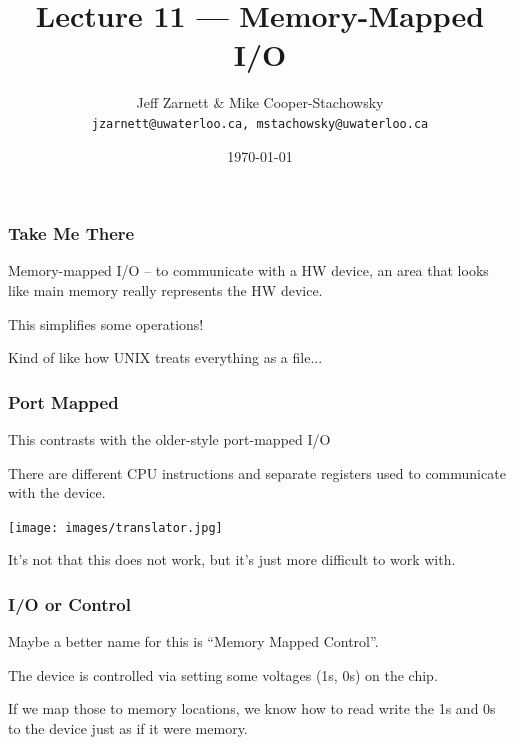 

\title{Lecture 11 --- Memory-Mapped I/O}

\author{Jeff Zarnett \& Mike Cooper-Stachowsky \\ \small \texttt{jzarnett@uwaterloo.ca, mstachowsky@uwaterloo.ca}}
\date{\today}



\begin{frame}
  \titlepage

 \end{frame}


\begin{frame}
\frametitle{Take Me There}

Memory-mapped I/O -- to communicate with a HW device, an area that looks like main memory really represents the HW device.

This simplifies some operations!

Kind of like how UNIX treats everything as a file...

\end{frame}

\begin{frame}
\frametitle{Port Mapped}

This contrasts with the older-style \alert{port-mapped} I/O

There are different CPU instructions and separate registers used to communicate with the device. 

\begin{center}
	\texttt{[image: images/translator.jpg]}
\end{center}

It's not that this does not work, but it's just more difficult to work with.

\end{frame}


\begin{frame}
\frametitle{I/O or Control}

Maybe a better name for this is ``Memory Mapped Control''.

The device is controlled via setting some voltages (1s, 0s) on the chip.

If we map those to memory locations, we know how to read write the 1s and 0s to the device just as if it were memory.

\end{frame}


